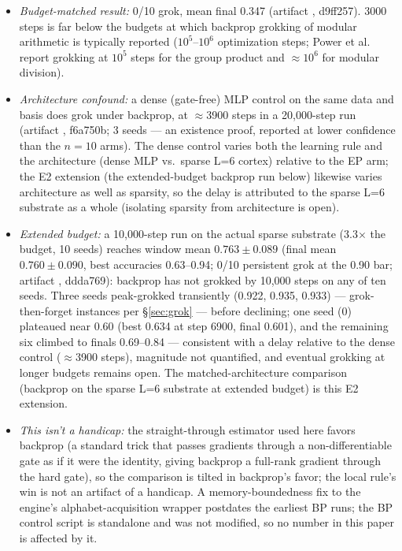 \documentclass[11pt]{article}
\begin{document}
\begin{itemize}
\begin{itemize}
\item \emph{Budget-matched result:} 0/10 grok, mean final 0.347 (artifact \texttt{}, d9ff257). 3000 steps is far below the budgets at which backprop grokking of modular arithmetic is typically reported ($10^5$--$10^6$ optimization steps; Power et al.~\cite{power2022} report grokking at $10^5$ steps for the group product and $\approx 10^6$ for modular division).
\item \emph{Architecture confound:} a dense (gate-free) MLP control on the same data and basis does grok under backprop, at $\approx$3900 steps in a 20{,}000-step run (artifact \texttt{}, f6a750b; 3 seeds --- an existence proof, reported at lower confidence than the $n{=}10$ arms). The dense control varies both the learning rule and the architecture (dense MLP vs.\ sparse L=6 cortex) relative to the EP arm; the E2 extension (the extended-budget backprop run below) likewise varies architecture as well as sparsity, so the delay is attributed to the sparse L=6 substrate as a whole (isolating sparsity from architecture is open).
\item \emph{Extended budget:} a 10{,}000-step run on the actual sparse substrate (3.3$\times$ the budget, 10 seeds) reaches window mean $0.763 \pm 0.089$ (final mean $0.760 \pm 0.090$, best accuracies 0.63--0.94; 0/10 persistent grok at the 0.90 bar; artifact \texttt{}, ddda769): backprop has not grokked by 10{,}000 steps on any of ten seeds. Three seeds peak-grokked transiently (0.922, 0.935, 0.933) --- grok-then-forget instances per \S\ref{sec:grok} --- before declining; one seed (0) plateaued near 0.60 (best 0.634 at step 6900, final 0.601), and the remaining six climbed to finals 0.69--0.84 --- consistent with a delay relative to the dense control ($\approx$3900 steps), magnitude not quantified, and eventual grokking at longer budgets remains open. The matched-architecture comparison (backprop on the sparse L=6 substrate at extended budget) is this E2 extension.
\item \emph{This isn't a handicap:} the straight-through estimator used here favors backprop (a standard trick that passes gradients through a non-differentiable gate as if it were the identity, giving backprop a full-rank gradient through the hard gate), so the comparison is tilted in backprop's favor; the local rule's win is not an artifact of a handicap. A memory-boundedness fix to the engine's alphabet-acquisition wrapper postdates the earliest BP runs; the BP control script is standalone and was not modified, so no number in this paper is affected by it.

\end{itemize}
\end{itemize}
\end{document}
